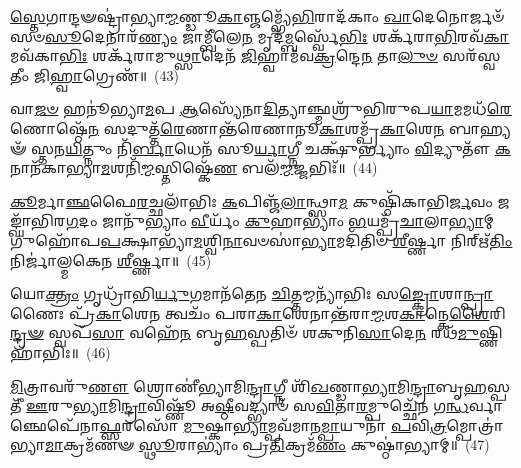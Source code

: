 {\anuvakamend[{\-\ul{𑌏}\-\-\ul{𑌨}\-\-\ul{𑌮}\-𑌸𑍍𑌯𑌾\-\ul{𑌨𑍍𑌨}\-𑌮𑍍𑌭𑍂\-\ul{𑌯𑍋}\-𑌸𑍍𑌯𑌾𑌨𑍍𑌨᳴𑌮𑍍𑌭𑌵𑌤𑌿}]}%

\-\ul{𑌸𑍍𑌤𑍇}\-𑌗𑌾𑌨𑍍𑌦𑍟𑌷𑍍𑌟𑍍𑌰𑌾॑𑌭𑍍𑌯𑌾\-\ul{𑌮𑍍𑌮}\-𑌣𑍍𑌡𑍂\-\ul{𑌕𑌾}\-𑌞𑍍𑌜𑌮𑍍𑌭𑍍𑌯𑍇᳴\-\ul{𑌭𑌿}\-𑌰𑌾𑌦᳴𑌕𑌾𑌂 \ul{𑌖𑌾}\-𑌦𑍇𑌨𑍋𑌰𑍍𑌜𑍞᳴ 𑌸𑍞\-\ul{𑌸𑍂}\-𑌦𑍇𑌨𑌾𑌰᳴\-\ul{𑌣𑍍𑌯𑌂} 𑌜𑌾𑌮𑍍𑌬𑍀᳴𑌲𑍇\-\ul{𑌨} 𑌮𑍃𑌦᳴\-\ul{𑌮𑍍𑌬}\-𑌰𑍍𑌸𑍍𑌵𑍇᳴\-\ul{𑌭𑌿𑌃} 𑌶𑌰𑍍𑌕᳴𑌰𑌾\-\ul{𑌭𑌿}\-𑌰𑌵᳴\-\ul{𑌕𑌾}\-𑌮𑌵᳴𑌕𑌾\-\ul{𑌭𑌿𑌃} 𑌶𑌰𑍍𑌕᳴𑌰𑌾𑌮𑍁\-\ul{𑌥𑍍𑌸𑌾}\-𑌦𑍇𑌨᳴ \ul{𑌜𑌿}\-𑌹𑍍𑌵𑌾𑌮᳴𑌵\-\ul{𑌕𑍍𑌰}\-𑌨𑍍𑌦𑍇\-\ul{𑌨} 𑌤𑌾\-\ul{𑌲𑍁}\-\-\ul{𑍞} 𑌸𑌰᳴𑌸𑍍𑌵𑌤𑍀𑌂 𑌜𑌿\-\ul{𑌹𑍍𑌵𑌾}\-𑌗𑍍𑌰𑍇𑌣᳴॥~(43)

{\anuvakamend[{\-\ul{𑌸𑍍𑌤𑍇}\-𑌗𑌾𑌨𑍍𑌦𑍍𑌵𑌾𑌵𑌿𑍞᳴𑌶𑌤𑌿𑌃}]}%

𑌵𑌾\-\ul{𑌜}\-\-\ul{𑍞} 𑌹𑌨𑍂॑𑌭𑍍𑌯𑌾\-\ul{𑌮}\-𑌪 \ul{𑌆}\-𑌸𑍍𑌯𑍇᳴𑌨𑌾\-\ul{𑌦𑌿}\-𑌤𑍍𑌯𑌾𑌞𑍍𑌛𑍍𑌮𑌶𑍍𑌰𑍁᳴𑌭𑌿𑌰𑍁𑌪\-\ul{𑌯𑌾}\-𑌮𑌮𑌧᳴\-\ul{𑌰𑍇}\-𑌣𑍋𑌷𑍍𑌠𑍇᳴\-\ul{𑌨} 𑌸𑌦𑍁𑌤𑍍𑌤᳴\-\ul{𑌰𑍇}\-𑌣𑌾𑌨𑍍𑌤᳴𑌰𑍇𑌣𑌾𑌨𑍂\-\ul{𑌕𑌾}\-𑌶𑌮𑍍𑌪𑍍𑌰᳴\-\ul{𑌕𑌾}\-𑌶𑍇\-\ul{𑌨} 𑌬𑌾𑌹𑍍𑌯𑍟᳴ 𑌸𑍍𑌤𑌨\-\ul{𑌯𑌿}\-𑌤𑍍𑌨𑍁𑌂 𑌨𑌿᳴\-\ul{𑌰𑍍𑌬𑌾}\-𑌧𑍇𑌨᳴ 𑌸𑍂\-\ul{𑌰𑍍𑌯𑌾}\-𑌗𑍍𑌨𑍀 𑌚𑌕𑍍𑌷𑍁᳴𑌰𑍍𑌭𑍍𑌯𑌾𑌂 \ul{𑌵𑌿}\-𑌦𑍍𑌯𑍁𑌤𑍗᳴ \ul{𑌕}\-𑌨𑌾𑌨᳴𑌕𑌾𑌭𑍍𑌯𑌾\-\ul{𑌮}\-𑌶𑌨𑌿᳴\-\ul{𑌮𑍍𑌮}\-𑌸𑍍𑌤𑌿𑌷𑍍𑌕𑍇᳴\-\ul{𑌣} 𑌬𑌲᳴\-\ul{𑌮𑍍𑌮}\-𑌜𑍍𑌜𑌭𑌿𑌃᳴॥~(44)

{\anuvakamend[{𑌵𑌾\-\ul{𑌜𑌂} 𑌪𑌞𑍍𑌚᳴𑌵𑌿𑍞𑌶𑌤𑌿𑌃}]}%

\-\ul{𑌕𑍂}\-𑌰𑍍𑌮𑌾\-\ul{𑌞𑍍𑌛}\-𑌫𑍈\-\ul{𑌰}\-𑌚𑍍𑌛𑌲𑌾᳴𑌭𑌿𑌃 \ul{𑌕}\-𑌪𑌿𑌞𑍍𑌜᳴\-\ul{𑌲𑌾}\-𑌨𑍍𑌥𑍍𑌸𑌾\-\ul{𑌮} 𑌕𑍁𑌷𑍍𑌠𑌿᳴𑌕𑌾𑌭𑌿\-\ul{𑌰𑍍𑌜}\-𑌵𑌂 𑌜𑌙𑍍𑌘𑌾᳴𑌭𑌿𑌰\-\ul{𑌗}\-𑌦𑌂 𑌜𑌾𑌨𑍁᳴𑌭𑍍𑌯𑌾𑌂 \ul{𑌵𑍀}\-𑌰𑍍𑌯𑌂᳴ \ul{𑌕𑍁}\-𑌹𑌾\-𑌭𑍍𑌯𑌾𑌂॑ \ul{𑌭}\-𑌯𑌮𑍍𑌪𑍍𑌰᳴\-\ul{𑌚𑌾}\-𑌲𑌾\-\ul{𑌭𑍍𑌯𑌾}\-𑌮𑍍 𑌗𑍁𑌹𑍋᳴𑌪\-\ul{𑌪}\-𑌕𑍍𑌷𑌾𑌭𑍍𑌯𑌾᳴\-\ul{𑌮}\-𑌶𑍍𑌵𑌿\-\ul{𑌨𑌾}\-𑌵𑍞𑌸𑌾॑\-\ul{𑌭𑍍𑌯𑌾}\-𑌮𑌦𑌿᳴𑌤𑌿𑍞 \ul{𑌶𑍀}\-𑌰𑍍𑌷𑍍𑌣𑌾 𑌨𑌿𑌰𑍍\mbox{}𑌋᳴\-\ul{𑌤𑌿𑌂} 𑌨𑌿𑌰𑍍𑌜𑌾॑𑌲𑍍𑌮𑌕𑍇𑌨 \ul{𑌶𑍀}\-𑌰𑍍𑌷𑍍𑌣𑌾॥~(45)

{\anuvakamend[{\-\ul{𑌕𑍂}\-𑌰𑍍𑌮𑌾𑌨𑍍𑌤𑍍𑌰𑌯𑍋᳴𑌵𑌿𑍞𑌶𑌤𑌿𑌃}]}%

𑌯𑍋\-\ul{𑌕𑍍𑌤𑍍𑌰𑌂} 𑌗𑍃𑌧𑍍𑌰𑌾᳴𑌭𑌿\-\ul{𑌰𑍍𑌯𑍁}\-𑌗𑌮𑌾𑌨᳴𑌤𑍇𑌨 \ul{𑌚𑌿}\-𑌤𑍍𑌤𑌮𑍍𑌮𑌨𑍍𑌯𑌾᳴𑌭𑌿𑌃 𑌸\-\ul{𑌙𑍍𑌕𑍍𑌰𑍋}\-𑌶𑌾\-\ul{𑌨𑍍𑌪𑍍𑌰𑌾}\-𑌣𑍈𑌃 𑌪𑍍𑌰᳴\-\ul{𑌕𑌾}\-𑌶𑍇\-\ul{𑌨} 𑌤𑍍𑌵𑌚𑌂᳴ 𑌪𑌰𑌾\-\ul{𑌕𑌾}\-𑌶𑍇𑌨𑌾𑌨𑍍𑌤᳴𑌰𑌾\-\ul{𑌮𑍍𑌮}\-𑌶\-\ul{𑌕𑌾}\-𑌨𑍍𑌕𑍇\-\ul{𑌶𑍈}\-𑌰𑌿\-\ul{𑌨𑍍𑌦𑍍𑌰}\-\-\ul{𑍟} 𑌸𑍍𑌵𑌪᳴\-\ul{𑌸𑌾} 𑌵𑌹𑍇᳴\-\ul{𑌨} 𑌬𑍃\-\ul{𑌹}\-𑌸𑍍𑌪𑌤𑌿𑍞᳴ 𑌶𑌕𑍁𑌨𑌿\-\ul{𑌸𑌾}\-𑌦𑍇\-\ul{𑌨} 𑌰𑌥᳴\-\ul{𑌮𑍁}\-𑌷𑍍𑌣𑌿𑌹𑌾᳴𑌭𑌿𑌃॥~(46)

{\anuvakamend[{𑌯𑍋\-\ul{𑌕𑍍𑌤𑍍𑌰}\-𑌮𑍇𑌕᳴𑌵𑌿𑍞𑌶𑌤𑌿𑌃}]}%

\-\ul{𑌮𑌿}\-𑌤𑍍𑌰𑌾𑌵𑌰𑍁᳴\-\ul{𑌣𑍗} 𑌶𑍍𑌰𑍋𑌣𑍀॑𑌭𑍍𑌯𑌾𑌮𑌿\-\ul{𑌨𑍍𑌦𑍍𑌰𑌾}\-𑌗𑍍𑌨𑍀 𑌶𑌿᳴\-\ul{𑌖}\-𑌣𑍍𑌡𑌾\-\ul{𑌭𑍍𑌯𑌾}\-𑌮𑌿\-\ul{𑌨𑍍𑌦𑍍𑌰𑌾}\-𑌬𑍃\-\ul{𑌹}\-𑌸𑍍𑌪𑌤𑍀᳴ \ul{𑌊}\-𑌰𑍁\-\ul{𑌭𑍍𑌯𑌾}\-𑌮𑌿\-\ul{𑌨𑍍𑌦𑍍𑌰𑌾}\-𑌵𑌿𑌷𑍍𑌣𑍂᳴ 𑌅\-\ul{𑌷𑍍𑌠𑍀}\-𑌵𑌦𑍍𑌭𑍍𑌯𑌾𑍞᳴ 𑌸\-\ul{𑌵𑌿}\-𑌤𑌾\-\ul{𑌰}\-𑌮𑍍𑌪𑍁𑌚𑍍𑌛𑍇᳴𑌨 𑌗\-\ul{𑌨𑍍𑌧}\-𑌰𑍍𑌵𑌾𑌞𑍍𑌛𑍇𑌪𑍇᳴𑌨𑌾\-\ul{𑌫𑍍𑌸}\-𑌰𑌸𑍋᳴ \ul{𑌮𑍁}\-𑌷𑍍𑌕𑌾\-\ul{𑌭𑍍𑌯𑌾}\-𑌮𑍍𑌪𑌵᳴𑌮𑌾𑌨\-\ul{𑌮𑍍𑌪𑌾}\-𑌯𑍁𑌨𑌾᳴ \ul{𑌪}\-𑌵𑌿\-\ul{𑌤𑍍𑌰}\-𑌮𑍍𑌪𑍋𑌤𑍍𑌰𑌾॑𑌭𑍍𑌯𑌾\-\ul{𑌮𑌾}\-𑌕𑍍𑌰𑌮᳴𑌣𑍟 \ul{𑌸𑍍𑌥𑍂}\-𑌰𑌾\-𑌭𑍍𑌯𑌾𑌂॑ 𑌪𑍍𑌰\-\ul{𑌤𑌿}\-𑌕𑍍𑌰𑌮᳴\-\ul{𑌣𑌂} 𑌕𑍁𑌷𑍍𑌠𑌾॑𑌭𑍍𑌯𑌾𑌮𑍍॥~(47)

